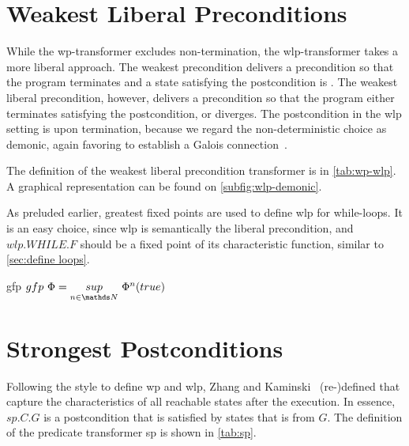 \section{Weakest Liberal Preconditions}\label{sec:wlp}
While the wp-transformer excludes non-termination, the wlp-transformer takes a more liberal approach. 
The weakest precondition delivers a precondition so that the program terminates and a state satisfying the postcondition is . 
The weakest liberal precondition, however, delivers a precondition so that the program either terminates satisfying the postcondition, or diverges. 
The postcondition in the wlp setting is  upon termination, because we regard the non-deterministic choice as demonic, again favoring to establish a Galois connection~\cite{zhang22}. 

The definition of the weakest liberal precondition transformer is in \autoref{tab:wp-wlp}. 
A graphical representation can be found on \autoref{subfig:wlp-demonic}. 

As preluded earlier, greatest fixed points are used to define wlp for while-loops. 
It is an easy choice, since wlp is semantically the  liberal precondition, and $wlp.WHILE.F$ should be a fixed point of its characteristic function, similar to \autoref{sec:define loops}. 

\begin{theorem}{gfp}{\normalfont\cite{kaminski19}}
  $gfp\ \Phi = \underset{n\in\N}{sup}\ \Phi^n(true)$
\end{theorem}





\section{Strongest Postconditions}\label{sec:sp}
Following the style to define wp and wlp, Zhang and Kaminski~\cite{zhang22} (re-)defined  that capture the characteristics of all reachable states after the execution. 
In essence, $sp.C.G$ is a postcondition that is satisfied by  states that is  from $G$. 
The definition of the predicate transformer sp is shown in \autoref{tab:sp}. 

